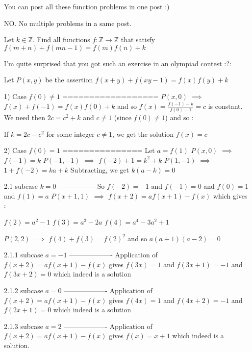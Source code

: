 \begin{solution}
	You can post all these function problems in one post :)
\end{solution}



\begin{solution}
	NO. No multiple problems in a same post.
\end{solution}



\begin{solution}
	\begin{tcolorbox}Let $ k\in\mathbb{Z} $. Find all functions $ f: \mathbb{Z}\rightarrow\mathbb{Z} $ that satisfy $ f(m+n)+f(mn-1)=f(m)f(n)+k $\end{tcolorbox}
I'm quite surprised that you got such an exercise in an olympiad contest :?:

Let $P(x,y)$ be the assertion $f(x+y)+f(xy-1)=f(x)f(y)+k$

1) Case $f(0)\ne 1$
==================
$P(x,0)$ $\implies$ $f(x)+f(-1)=f(x)f(0)+k$ and so $f(x)=\frac{f(-1)-k}{f(0)-1}=c$ is constant.
We need then $2c=c^2+k$ and $c\ne 1$ (since $f(0)\ne 1$) and so :

If $k=2c-c^2$ for some integer $c\ne 1$, we get the solution $f(x)=c$

2) Case $f(0)=1$
===============
Let $a=f(1)$
$P(x,0)$ $\implies$ $f(-1)=k$
$P(-1,-1)$ $\implies$  $f(-2)+1=k^2+k$
$P(1,-1)$ $\implies$ $1+f(-2)=ka+k$
Subtracting, we get $k(a-k)=0$

2.1 subcase $k=0$
----------------
So $f(-2)=-1$ and $f(-1)=0$ and $f(0)=1$ and $f(1)=a$
$P(x+1,1)$ $\implies$ $f(x+2)=af(x+1)-f(x)$ which gives :

$f(2)=a^2-1$
$f(3)=a^3-2a$
$f(4)=a^4-3a^2+1$

$P(2,2)$ $\implies$ $f(4)+f(3)=f(2)^2$ and so $a(a+1)(a-2)=0$

2.1.1 subcase $a=-1$
-------------------
Application of $f(x+2)=af(x+1)-f(x)$ gives 
$f(3x)=1$ and $f(3x+1)=-1$ and $f(3x+2)=0$ which indeed is a solution

2.1.2 subcase $a=0$
-------------------
Application of $f(x+2)=af(x+1)-f(x)$ gives 
$f(4x)=1$ and $f(4x+2)=-1$ and $f(2x+1)=0$ which indeed is a solution

2.1.3 subcase $a=2$
-------------------
Application of $f(x+2)=af(x+1)-f(x)$ gives 
$f(x)=x+1$ which indeed is a solution.


\end{solution}
